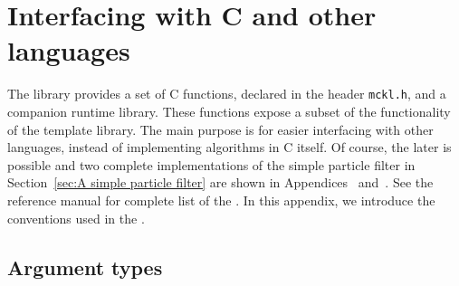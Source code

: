 \chapter{Interfacing with C and other languages}
\label{chap:Interfacing with C and other languages}

The library provides a set of C functions, declared in the header
\verb|mckl.h|, and a companion runtime library. These functions expose a subset
of the functionality of the \cpp template library. The main purpose is for
easier interfacing with other languages, instead of implementing algorithms in
C itself. Of course, the later is possible and two complete \cnn
implementations of the simple particle filter in Section~\ref{sec:A simple
  particle filter} are shown in Appendices~ and~. See the reference manual for complete list of the \api. In this appendix,
we introduce the conventions used in the \api.

\section{Argument types}
\label{sec:Argument types}

